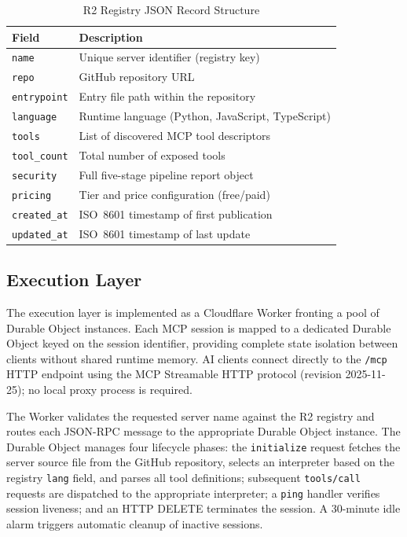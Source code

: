 \documentclass[conference]{IEEEtran}
\begin{document}
\begin{table}[htbp]
  \caption{R2 Registry JSON Record Structure}
  \label{tab:registry}
  \centering
  \begin{tabular}{lp{4.5cm}}
    \toprule
    \textbf{Field} & \textbf{Description} \\
    \midrule
    \texttt{name}           & Unique server identifier (registry key) \\
    \texttt{repo}           & GitHub repository URL \\
    \texttt{entrypoint}     & Entry file path within the repository \\
    \texttt{language}       & Runtime language (Python, JavaScript, TypeScript) \\
    \texttt{tools}          & List of discovered MCP tool descriptors \\
    \texttt{tool\_count}    & Total number of exposed tools \\
    \texttt{security}       & Full five-stage pipeline report object \\
    \texttt{pricing}        & Tier and price configuration (free/paid) \\
    \texttt{created\_at}   & ISO~8601 timestamp of first publication \\
    \texttt{updated\_at}   & ISO~8601 timestamp of last update \\
    \bottomrule
  \end{tabular}
\end{table}

\subsection{Execution Layer}

The execution layer is implemented as a Cloudflare Worker fronting a
pool of Durable Object instances.
Each MCP session is mapped to a dedicated Durable Object keyed on the
session identifier, providing complete state isolation between clients
without shared runtime memory.
AI clients connect directly to the \texttt{/mcp} HTTP endpoint using
the MCP Streamable HTTP protocol (revision 2025-11-25); no local proxy
process is required.

The Worker validates the requested server name against the R2 registry
and routes each JSON-RPC message to the appropriate Durable Object
instance.
The Durable Object manages four lifecycle phases: the
\texttt{initialize} request fetches the server source file from the
GitHub repository, selects an interpreter based on the registry
\texttt{lang} field, and parses all tool definitions; subsequent
\texttt{tools/call} requests are dispatched to the appropriate
interpreter; a \texttt{ping} handler verifies session liveness; and an
HTTP DELETE terminates the session.
A 30-minute idle alarm triggers automatic cleanup of inactive sessions.
\end{document}
